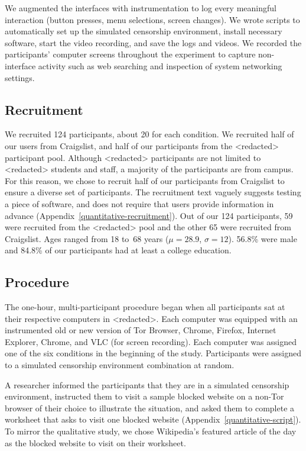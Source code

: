 \documentclass[USenglish,oneside,twocolumn]{article}
\begin{document}
We augmented the interfaces with instrumentation 
to log every meaningful interaction
(button presses, menu selections, screen changes).
We wrote scripts to automatically set up the simulated censorship environment, install necessary software, 
start the video recording, and save the logs and videos.
We recorded the participants' computer screens
throughout the experiment to capture non-interface activity such as 
web searching and inspection of system networking settings.

\subsection{Recruitment}
We recruited 124 participants, about 20 for each
condition. We recruited half of our users from Craigslist, and half of our participants from 
the <redacted> %
participant pool. Although <redacted> %
participants are not limited to <redacted> %
students and staff,
a majority of the participants are from campus. For this reason, we chose to recruit 
half of our participants from Craigslist to ensure a diverse set of participants. 
The recruitment text vaguely suggests testing a piece of software, and does not require
that users provide information in advance (Appendix~\ref{quantitative-recruitment}). 
Out of our 124 participants, 59 were recruited from the <redacted> %
pool and the other 65 were
recruited from Craigslist. Ages ranged from 18 to~68 years
($\mu = 28.9$, $\sigma = 12$). 56.8\% were male and 
84.8\% of our participants had at least a college education.

\subsection{Procedure}
The one-hour, multi-participant procedure began when all participants sat at their
respective computers in <redacted>. %
Each computer was equipped with an instrumented old or new version
of Tor Browser, Chrome, Firefox, Internet Explorer,  Chrome, and VLC (for screen recording).
Each computer was assigned one of the six conditions in the beginning of the study. Participants
were assigned to a simulated censorship environment combination at random. 

A researcher informed the participants that they are in a
simulated censorship environment, instructed them to visit a sample blocked website on a 
non-Tor browser of their choice to illustrate the situation, and asked them to 
complete a worksheet that asks to visit one blocked website (Appendix~\ref{quantitative-script}). 
To mirror the qualitative study, we chose Wikipedia's featured article of the day 
as the blocked website to visit on their worksheet. 
\end{document}
